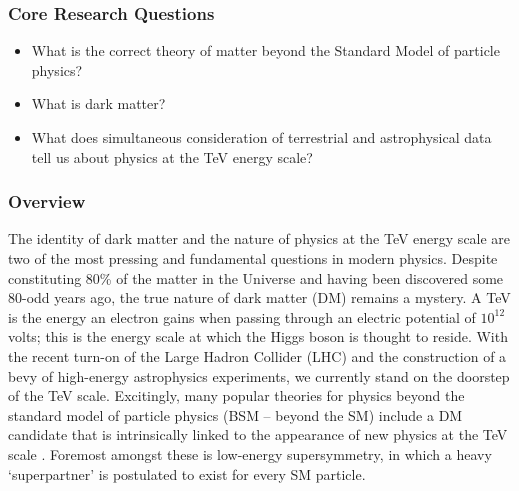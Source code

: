 \documentclass[10pt,oneside,twocolumn,a4paper]{article}
\author{Pat Scott}
\date{}
\begin{document}

\thispagestyle{fancy}




\subsubsection*{Core Research Questions}

\begin{itemize}
\item What is the correct theory of matter beyond the Standard Model of particle physics?  
\item What is dark matter?
\item What does simultaneous consideration of terrestrial and astrophysical data tell us about physics at the TeV energy scale?
\end{itemize}

\subsubsection*{Overview}

The identity of dark matter and the nature of physics at the TeV energy scale are two of the most pressing and fundamental questions in modern physics.   Despite constituting 80\% of the matter in the Universe and having been discovered some 80-odd years ago, the true nature of dark matter (DM) remains a mystery.  A TeV is the energy an electron gains when passing through an electric potential of $10^{12}$ volts; this is the energy scale at which the Higgs boson is thought to reside.  With the recent turn-on of the Large Hadron Collider (LHC) and the construction of a bevy of high-energy astrophysics experiments, we currently stand on the doorstep of the TeV scale.  Excitingly, many popular theories for physics beyond the standard model of particle physics (BSM -- beyond the SM) include a DM candidate that is intrinsically linked to the appearance of new physics at the TeV scale \cite{Jungman96,Bergstrom00,Bertone05}.  Foremost amongst these is low-energy supersymmetry, in which a heavy `superpartner' is postulated to exist for every SM particle.
\end{document}
